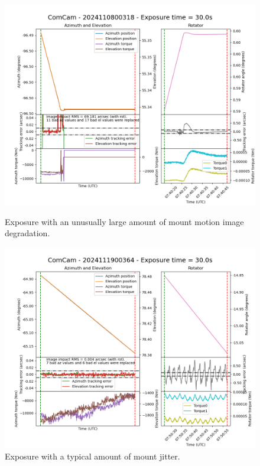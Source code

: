 \begin{figure}[h]
    \centering
    \begin{minipage}{0.49\textwidth}
        \centering
        \includegraphics[width=\linewidth]{image_quality_figures/ComCam_Mount_Plot_2024110800318.png}
        \caption{Exposure with an unusually large amount of mount motion image degradation.}
        \label{fig:jitter_1}
    \end{minipage}\hfill
    \begin{minipage}{0.49\textwidth}
        \centering
        \includegraphics[width=\linewidth]{image_quality_figures/ComCam_Mount_Plot_2024111900364.png}
        \caption{Exposure with a typical amount of mount jitter.}
        \label{fig:jitter_2}
    \end{minipage}
\end{figure}